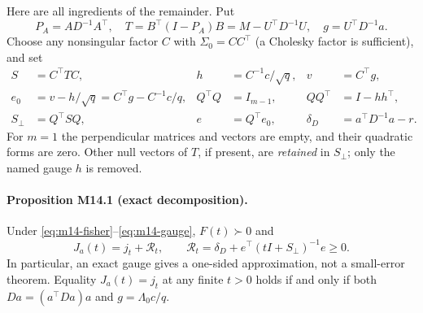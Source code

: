 Here are all ingredients of the remainder.  Put
\begin{equation}
 P_A=AD^{-1}A^\top,\quad T=B^\top(I-P_A)B=M-U^\top D^{-1}U,\quad
 g=U^\top D^{-1}a.
 \label{eq:m14-projection}
\end{equation}
Choose any nonsingular factor $C$ with $\Sigma_0=CC^\top$ (a Cholesky factor
is sufficient), and set
\begin{align}
 S&=C^\top T C, & h&=C^{-1}c/\sqrt q, & v&=C^\top g,\\
 e_0&=v-h/\sqrt q=C^\top g-C^{-1}c/q, &
 Q^\top Q&=I_{m-1}, & QQ^\top&=I-hh^\top,\\
 S_\perp&=Q^\top S Q, & e&=Q^\top e_0, &
 \delta_D&=a^\top D^{-1}a-r.
 \label{eq:m14-residual-definitions}
\end{align}
For $m=1$ the perpendicular matrices and vectors are empty, and their
quadratic forms are zero.  Other null vectors of $T$, if present, are
\emph{retained} in $S_\perp$; only the named gauge $h$ is removed.

\paragraph{Proposition M14.1 (exact decomposition).}
Under \eqref{eq:m14-fisher}--\eqref{eq:m14-gauge}, $F(t)\succ0$ and
\begin{equation}
 \boxed{\quad J_a(t)=j_t+\mathcal R_t,\qquad
 \mathcal R_t=\delta_D+e^\top(tI+S_\perp)^{-1}e\geq0.\quad}
 \label{eq:m14-exact-remainder}
\end{equation}
In particular, an exact gauge gives a one-sided approximation, not a
small-error theorem.  Equality $J_a(t)=j_t$ at any finite $t>0$ holds if and
only if both $Da=(a^\top Da)a$ and $g=\Lambda_0c/q$.

